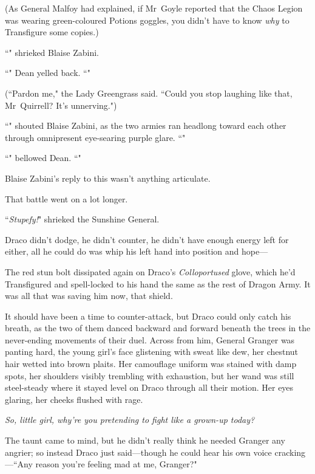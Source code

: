 (As General Malfoy had explained, if Mr~Goyle reported that the Chaos Legion was wearing green-coloured Potions goggles, you didn't have to know \emph{why} to Transfigure some copies.)

``" shrieked Blaise Zabini.

``" Dean yelled back. ``"

(``Pardon me," the Lady Greengrass said. ``Could you stop laughing like that, Mr~Quirrell? It's unnerving.")

``" shouted Blaise Zabini, as the two armies ran headlong toward each other through omnipresent eye-searing purple glare. ``"

``" bellowed Dean. ``"

Blaise Zabini's reply to this wasn't anything articulate.

That battle went on a lot longer.

\later

``\emph{Stupefy!}" shrieked the Sunshine General.

Draco didn't dodge, he didn't counter, he didn't have enough energy left for either, all he could do was whip his left hand into position and hope—

The red stun bolt dissipated again on Draco's \emph{Colloportused} glove, which he'd Transfigured and spell-locked to his hand the same as the rest of Dragon Army. It was all that was saving him now, that shield.

It should have been a time to counter-attack, but Draco could only catch his breath, as the two of them danced backward and forward beneath the trees in the never-ending movements of their duel. Across from him, General Granger was panting hard, the young girl's face glistening with sweat like dew, her chestnut hair wetted into brown plaits. Her camouflage uniform was stained with damp spots, her shoulders visibly trembling with exhaustion, but her wand was still steel-steady where it stayed level on Draco through all their motion. Her eyes glaring, her cheeks flushed with rage.

\emph{So, little girl, why're you pretending to fight like a grown-up today?}

The taunt came to mind, but he didn't really think he needed Granger any angrier; so instead Draco just said—though he could hear his own voice cracking—``Any reason you're feeling mad at me, Granger?"


